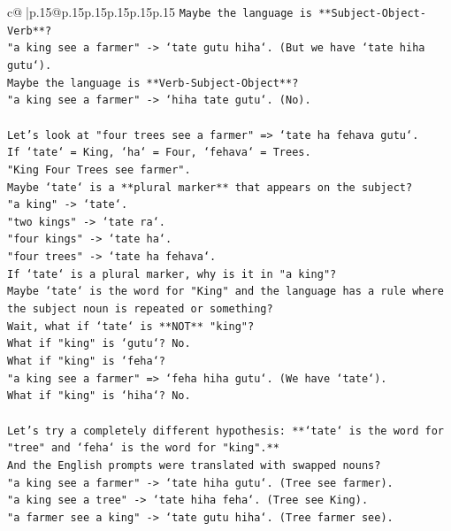 \documentclass{article}
\begin{document}
{\begin{supertabular}{c@{$\;$}|p{.15\linewidth}@{}p{.15\linewidth}p{.15\linewidth}p{.15\linewidth}p{.15\linewidth}p{.15\linewidth}}
{{{\texttt{Maybe the language is **Subject{-}Object{-}Verb**?} \\
\texttt{"a king see a farmer" {-}> `tate gutu hiha`. (But we have `tate hiha gutu`).} \\
\texttt{Maybe the language is **Verb{-}Subject{-}Object**?} \\
\texttt{"a king see a farmer" {-}> `hiha tate gutu`. (No).} \\
\\ 
\texttt{Let's look at "four trees see a farmer" => `tate ha fehava gutu`.} \\
\texttt{If `tate` = King, `ha` = Four, `fehava` = Trees.} \\
\texttt{"King Four Trees see farmer".} \\
\texttt{Maybe `tate` is a **plural marker** that appears on the subject?} \\
\texttt{"a king" {-}> `tate`.} \\
\texttt{"two kings" {-}> `tate ra`.} \\
\texttt{"four kings" {-}> `tate ha`.} \\
\texttt{"four trees" {-}> `tate ha fehava`.} \\
\texttt{If `tate` is a plural marker, why is it in "a king"?} \\
\texttt{Maybe `tate` is the word for "King" and the language has a rule where the subject noun is repeated or something?} \\
\texttt{Wait, what if `tate` is **NOT** "king"?} \\
\texttt{What if "king" is `gutu`? No.} \\
\texttt{What if "king" is `feha`?} \\
\texttt{"a king see a farmer" => `feha hiha gutu`. (We have `tate`).} \\
\texttt{What if "king" is `hiha`? No.} \\
\\ 
\texttt{Let's try a completely different hypothesis: **`tate` is the word for "tree" and `feha` is the word for "king".**} \\
\texttt{And the English prompts were translated with swapped nouns?} \\
\texttt{"a king see a farmer" {-}> `tate hiha gutu`. (Tree see farmer).} \\
\texttt{"a king see a tree" {-}> `tate hiha feha`. (Tree see King).} \\
\texttt{"a farmer see a king" {-}> `tate gutu hiha`. (Tree farmer see).} \\
}}}
\end{supertabular}}
\end{document}
